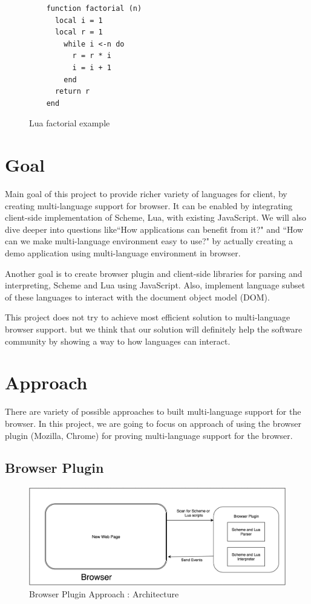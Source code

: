 \begin{figure}[h]
	\begin{lstlisting}
	function factorial (n)
	  local i = 1
	  local r = 1
	    while i <-n do 
	      r = r * i
	      i = i + 1
	    end
	  return r
 	end
	\end{lstlisting}
	\caption{Lua factorial example}
	\label{fig:luafactorial}
\end{figure}


\section{Goal}

Main goal of this project to provide richer variety of languages for client, by creating multi-language support for browser. It can be enabled by integrating client-side implementation of Scheme, Lua, with existing JavaScript. We will also dive deeper into questions like``How applications can benefit from it?" and ``How can we make multi-language environment easy to use?" by actually creating a demo application using multi-language environment in browser.

Another goal is to create browser plugin and client-side libraries for parsing and interpreting, Scheme and Lua using JavaScript. Also, implement language subset of these languages to interact with the document object model (DOM).

This project does not try to achieve most efficient solution to multi-language browser support. but we think that our solution will definitely help the software community by showing a way to how languages can interact.

\section{Approach}

There are variety of possible approaches to built multi-language support for the browser. In this project, we are going to focus on approach of using the browser plugin (Mozilla, Chrome) for proving multi-language support for the browser. 

\subsection{Browser Plugin } 

\begin{figure}[h]
	\begin{center}
		\includegraphics[width=\linewidth]{./images/browserPluginApproach.png}
	\end{center}
	\caption{Browser Plugin Approach : Architecture}
	\label{fig:pluginarchitecture}
\end{figure}

